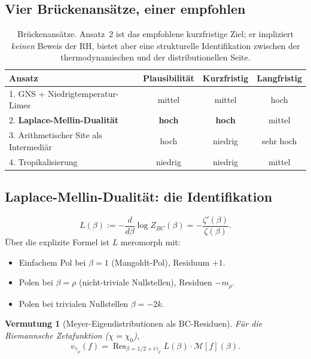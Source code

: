 \documentclass[11pt,a4paper]{article}
\theoremstyle{plain}
\newtheorem{conjecture}[theorem]{Vermutung}
\theoremstyle{definition}
\DeclareMathOperator{\Res}{Res}
\newcommand{\chifn}{\chi}
\begin{document}
\subsection{Vier Brückenansätze, einer empfohlen}

\begin{table}[h]
\centering
\begin{tabular}{@{}lccc@{}}
\toprule
\textbf{Ansatz} & \textbf{Plausibilität} & \textbf{Kurzfristig} & \textbf{Langfristig} \\
\midrule
1. GNS + Niedrigtemperatur-Limes & mittel & mittel & hoch \\
2. \textbf{Laplace-Mellin-Dualität} & \textbf{hoch} & \textbf{hoch} & mittel \\
3. Arithmetischer Site als Intermediär & hoch & niedrig & sehr hoch \\
4. Tropikalisierung & niedrig & niedrig & mittel \\
\bottomrule
\end{tabular}
\caption{Brückenansätze. Ansatz~2 ist das empfohlene kurzfristige Ziel;
er impliziert \emph{keinen} Beweis der RH, bietet aber eine strukturelle Identifikation
zwischen der thermodynamischen und der distributionellen Seite.}
\label{tab:bridge-approaches}
\end{table}

\subsection{Laplace-Mellin-Dualität: die Identifikation}

\begin{equation}
\label{eq:log-z-deriv}
  L(\beta) := -\frac{d}{d\beta} \log Z_{BC}(\beta)
    = -\frac{\zeta'(\beta)}{\zeta(\beta)}.
\end{equation}
Über die explizite Formel ist $L$ meromorph mit:
\begin{itemize}
  \item Einfachem Pol bei $\beta = 1$ (Mangoldt-Pol), Residuum $+1$.
  \item Polen bei $\beta = \rho$ (nicht-triviale Nullstellen), Residuen $-m_\rho$.
  \item Polen bei trivialen Nullstellen $\beta = -2k$.
\end{itemize}

\begin{conjecture}[Meyer-Eigendistributionen als BC-Residuen]
\label{conj:meyer-bc}
Für die Riemannsche Zetafunktion ($\chifn = \chifn_0$),
\[
  v_{\gamma_\rho}(f) = \Res_{\beta = 1/2 + i\gamma_\rho}
    L(\beta) \cdot \mathcal M[f](\beta).
\]
\end{conjecture}
\end{document}
